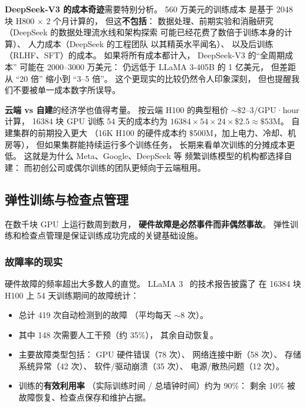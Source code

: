 \textbf{DeepSeek-V3 的成本奇迹}需要特别分析。
560 万美元的训练成本
是基于 2048 块 H800 $\times$ 2 个月计算的，
但这\textbf{不包括}：
数据处理、前期实验和消融研究
（DeepSeek 的数据处理流水线和架构探索
可能已经花费了数倍于训练本身的计算）、
人力成本（DeepSeek 的工程团队
以其精英水平闻名）、
以及后训练（RLHF、SFT）的成本。
如果将所有成本都计入，
DeepSeek-V3 的“全周期成本”
可能在 2000--3000 万美元：
仍远低于 LLaMA 3-405B 的 1 亿美元，
但差距从 “20 倍” 缩小到 “3--5 倍”。
这个更现实的比较仍然令人印象深刻，
但也提醒我们不要被单一成本数字所误导。

\textbf{云端 vs 自建}的经济学也值得考量。
按云端 H100 的典型租价 $\sim$$\$$2--3/GPU·hour 计算，
16384 块 GPU 训练 54 天的成本约为
$16384 \times 54 \times 24 \times \$2.5 \approx \$53$M。
自建集群的前期投入更大
（16K H100 的硬件成本约 $\$$500M，加上电力、冷却、机房等），
但如果集群能持续运行多个训练任务，
长期来看单次训练的分摊成本更低。
这就是为什么 Meta、Google、DeepSeek 等
频繁训练模型的机构都选择自建：
而初创公司或偶尔训练的团队更倾向于云端租用。

\subsection{弹性训练与检查点管理}

在数千块 GPU 上运行数周到数月，
\textbf{硬件故障是必然事件而非偶然事故}。
弹性训练和检查点管理是保证训练成功完成的关键基础设施。

\subsubsection{故障率的现实}

硬件故障的频率超出大多数人的直觉。
LLaMA 3~\cite{dubey2024llama3} 的技术报告披露了
在 16384 块 H100 上 54 天训练期间的故障统计：
\begin{itemize}[noitemsep]
  \item 总计 419 次自动检测到的故障
        （平均每天 $\sim$8 次）。
  \item 其中 148 次需要人工干预（约 35\%），
        其余自动恢复。
  \item 主要故障类型包括：
        GPU 硬件错误（78 次）、
        网络连接中断（58 次）、
        存储系统异常（42 次）、
        软件/驱动崩溃（35 次）、
        电源/散热问题（12 次）。
  \item 训练的\textbf{有效利用率}
        （实际训练时间 / 总墙钟时间）约为 90\%：
        剩余 10\% 被故障恢复、检查点保存和维护占据。
\end{itemize}


